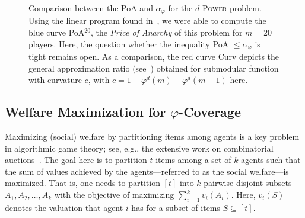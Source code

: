 \begin{figure}[!h]
  \begin{center}
  \end{center}
  \caption{Comparison between the PoA and $\alpha_{\varphi}$ for the $d$-\textsc{Power} problem. Using the linear program found in~\cite{PM19}, we were able to compute the blue curve PoA$^{20}$, the \emph{Price of Anarchy} of this problem for $m=20$ players. Here, the question whether the inequality PoA $\leq \alpha_{\varphi}$ is tight remains open. As a comparison, the red curve Curv depicts the general approximation ratio (see~\cite{SVW17}) obtained for submodular function with curvature $c$, with $c=1-\varphi^d(m) + \varphi^d(m-1)$ here.}
  \label{fig:dPower}
\end{figure}

\subsection{Welfare Maximization for $\varphi$-Coverage}
Maximizing (social) welfare by partitioning items among agents is a key problem in algorithmic game theory; see, e.g., the extensive work on combinatorial auctions~\cite{NRTV07}. The goal here is to partition $t$ items among a set of $k$ agents such that the sum of values achieved by the agents---referred to as the social welfare---is maximized. That is, one needs to partition $[t]$ into $k$ pairwise disjoint subsets $A_1, A_2, \ldots, A_k$ with the objective of maximizing $\sum_{i=1}^k v_i(A_i)$. Here, $v_i(S)$ denotes the valuation that agent $i$ has for a subset of items $S \subseteq [t]$. 

